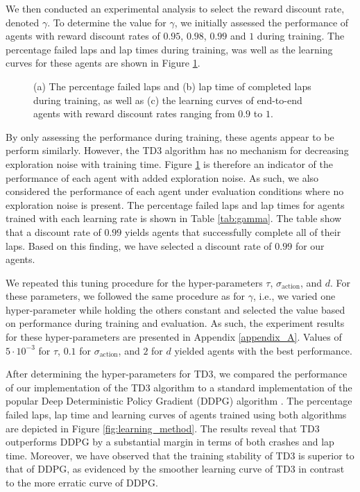 We then conducted an experimental analysis to select the reward discount rate, denoted $\gamma$. 
To determine the value for $\gamma$, we initially assessed the performance of agents with reward discount rates of $0.95$, $0.98$, $0.99$ and $1$ during training.
The percentage failed laps and lap times during training, was well as the learning curves for these agents are shown in Figure \ref{fig:gamma}.

\begin{figure}[htb!]
    \centering
    
    \caption[Learning curves for tuning reward discount rate]{(a) The percentage failed laps and (b) lap time of completed laps during training, as well as (c) the learning curves of end-to-end agents with reward discount rates ranging from $0.9$ to $1$.}
    \label{fig:gamma}
\end{figure}

By only assessing the performance during training, these agents appear to be perform similarly.
However, the TD3 algorithm has no mechanism for decreasing exploration noise with training time.
Figure \ref{fig:gamma} is therefore an indicator of the performance of each agent with added exploration noise.
As such, we also considered the performance of each agent under evaluation conditions where no exploration noise is present.
The percentage failed laps and lap times for agents trained with each learning rate is shown in Table \ref{tab:gamma}.
The table show that a discount rate of $0.99$ yields agents that successfully complete all of their laps. 
Based on this finding, we have selected a discount rate of $0.99$ for our agents.



We repeated this tuning procedure for the hyper-parameters $\tau$, $\sigma_{\text{action}}$, and $d$. 
For these parameters, we followed the same procedure as for $\gamma$, i.e., we varied one hyper-parameter while holding the others constant and selected the value based on performance during training and evaluation. 
As such, the experiment results for these hyper-parameters are presented in Appendix \ref{appendix_A}. 
Values of $5\cdot10^{-3}$ for $\tau$, $0.1$ for $\sigma_{\text{action}}$, and $2$ for $d$ yielded agents with the best performance.


After determining the hyper-parameters for TD3, we compared the performance of our implementation of the TD3 algorithm to a standard implementation of the popular Deep Deterministic Policy Gradient (DDPG) algorithm  \cite{Ivanov2020, Capo2020, Niu2020}.
The percentage failed laps, lap time and learning curves of agents trained using both algorithms are depicted in Figure \ref{fig:learning_method}.
The results reveal that TD3 outperforms DDPG by a substantial margin in terms of both crashes and lap time.
Moreover, we have observed that the training stability of TD3 is superior to that of DDPG, as evidenced by the smoother learning curve of TD3 in contrast to the more erratic curve of DDPG.

